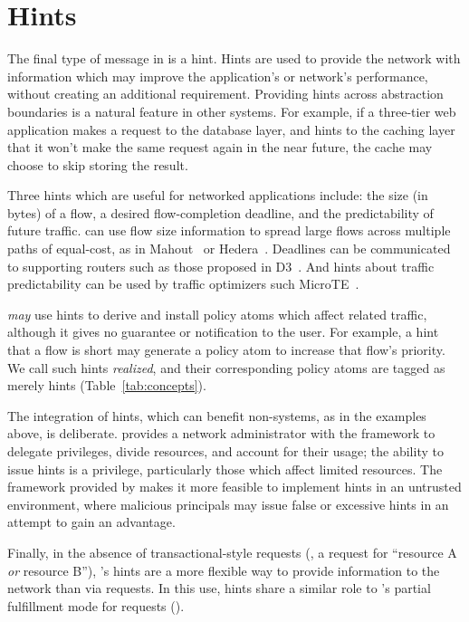 \section{Hints}
\label{sec:Hints}

The final type of message in \sys is a hint. Hints are used to provide
the network with information which may improve the application's or
network's performance, without creating an additional
requirement. Providing hints across abstraction boundaries is a
natural feature in other systems.
For example, if a three-tier web application makes
a request to the database layer, and hints to the caching layer that it
won't make the same request again in the near future, the cache may
choose to skip storing the result.

Three hints which are useful for networked applications include: the
size (in bytes) of a flow, a desired flow-completion deadline, and the
predictability of future traffic. \sys can use flow size information
to spread large flows across multiple paths of equal-cost, as in Mahout~\cite{curtis11mahout} or
Hedera~\cite{alfares10hedera}.  Deadlines
can be communicated to supporting routers such as those proposed in
D3~\cite{wilson11d3}. And hints about traffic predictability can be
used by traffic optimizers such MicroTE~\cite{Benson2011microte}.

\sys \emph{may} use hints to derive and install policy atoms which affect
related traffic, although it gives no guarantee or notification to the user. 
For example, a hint that a flow is short may generate
a policy atom to increase that flow's priority. We call such hints
\emph{realized}, and their corresponding policy atoms are tagged as
merely hints (\cf Table~\ref{tab:concepts}).

The integration of hints, which can benefit non-\sys systems, as in
the examples above, is deliberate. \sys provides a network
administrator with the framework to delegate privileges, divide
resources, and account for their usage; the ability to issue hints is
a privilege, particularly those which affect limited resources.  The
framework provided by \sys makes it more feasible to implement hints
in an untrusted environment, where malicious principals may issue
false or excessive hints in an attempt to gain an advantage.

Finally, in the absence of transactional-style requests (\eg, a
request for ``resource A \emph{or} resource B''), \sys's hints are a
more flexible way to provide information to the network than via
requests. In this use, hints share a similar role to \sys's partial
fulfillment mode for requests ().

